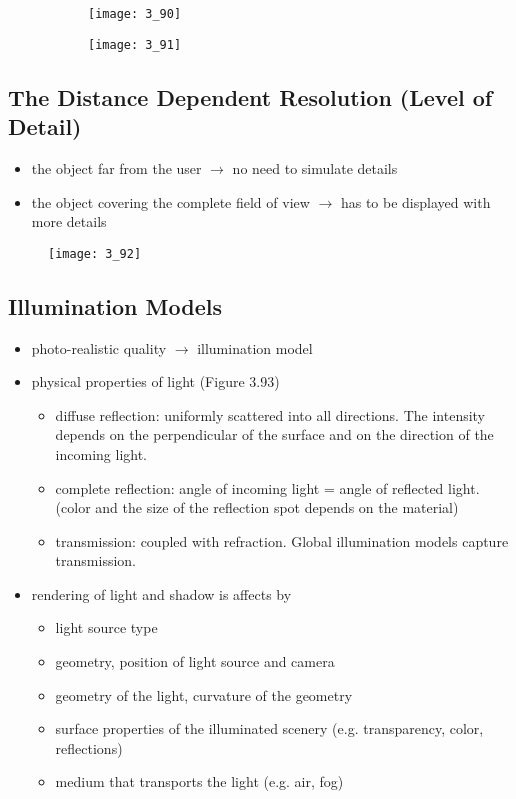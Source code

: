 \documentclass{standalone}
\begin{document}
\begin{figure}[h]
	\centering
	\begin{subfigure}[b]{0.45\textwidth}
		\texttt{[image: 3\_90]}
	\end{subfigure}
	\begin{subfigure}[b]{0.45\textwidth}
		\texttt{[image: 3\_91]}
	\end{subfigure}
\end{figure}

\subsection{The Distance Dependent Resolution (Level of Detail)}

\begin{itemize}
	\item the object far from the user $\rightarrow$ no need to simulate details
	\item the object covering the complete field of view $\rightarrow$ has to be displayed with more details
\end{itemize}

\begin{figure}[H]
	\texttt{[image: 3\_92]}
\end{figure}


\subsection{Illumination Models}

\begin{itemize}
	\item photo-realistic quality $\rightarrow$ illumination model
	\item physical properties of light (Figure 3.93)
		\begin{itemize}
			\item diffuse reflection: uniformly scattered into all directions. The intensity depends on the perpendicular of the surface and on the direction of the incoming light.
			\item complete reflection: angle of incoming light = angle of reflected light. (color and the size of the reflection spot depends on the material)
			\item transmission: coupled with refraction. Global illumination models capture transmission.
		\end{itemize}
	\item rendering of light and shadow is affects by			
		\begin{itemize}
			\item light source type
			\item geometry, position of light source and camera
			\item geometry of the light, curvature of the geometry
			\item surface properties of the illuminated scenery (e.g. transparency, color, reflections)
			\item medium that transports the light (e.g. air, fog)
		\end{itemize}
\end{itemize}
\end{document}
